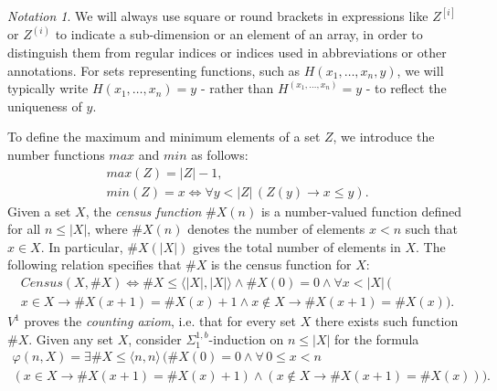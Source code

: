 \documentclass{article}
\theoremstyle{definition}
\theoremstyle{theorem}
\theoremstyle{theorem}
\theoremstyle{remark}
\theoremstyle{remark}
\theoremstyle{example}
\theoremstyle{notation}
\newtheorem{notation}{Notation}
\theoremstyle{theorem}
\begin{document}
\begin{notation}
We will always use square or round brackets in expressions like $Z^{[i]}$ or $Z^{(i)}$ to indicate a sub-dimension or an element of an array, in order to distinguish them from regular indices or indices used in abbreviations or other annotations. For sets representing functions, such as $H(x_1, \ldots, x_n, y)$, we will typically write $H(x_1, \ldots, x_n) = y$ - rather than $H^{(x_1, \ldots, x_n)} = y$ - to reflect the uniqueness of $y$.
\end{notation}
To define the maximum and minimum elements of a set $Z$, we introduce the number functions $max$ and $min$ as follows:
\begin{equation}\label{ala9s7d5tdhgdfr}
\begin{gathered}
\hspace{0pt} max(Z) = |Z| - 1, \\
min(Z) = x \iff \forall y < |Z|\, (Z(y) \rightarrow x \leq y).
\end{gathered}
\end{equation}
Given a set $X$, the \emph{census function} $\#X(n)$ is a number-valued function defined for all $n \leq |X|$, where $\#X(n)$ denotes the number of elements $x < n$ such that $x \in X$. In particular, $\#X(|X|)$ gives the total number of elements in $X$. The following relation specifies that $\#X$ is the census function for $X$:
\begin{equation}
\begin{gathered}
Census(X, \#X) \iff \#X \leq \langle |X|, |X| \rangle \wedge \#X(0) = 0 \wedge \forall x < |X|\, \big( \\
x \in X \rightarrow \#X(x+1) = \#X(x) + 1 \wedge 
x \notin X \rightarrow \#X(x+1) = \#X(x) \big).
\end{gathered}
\end{equation}
$V^1$ proves the \emph{counting axiom}, i.e. that for every set $X$ there exists such function $\#X$. Given any set $X$, consider $\Sigma^{1,b}_1$-induction on $n \leq |X|$ for the formula
\begin{equation}
\begin{gathered}
\varphi(n, X) = \exists \#X \leq \langle n, n \rangle\, \big( \#X(0) = 0 \wedge \forall\, 0 \leq x < n \\
(x \in X \rightarrow \#X(x+1) = \#X(x) + 1) \wedge 
(x \notin X \rightarrow \#X(x+1) = \#X(x)) \big).
\end{gathered}
\end{equation} 
\end{document}
